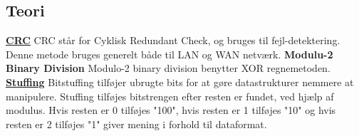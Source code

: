 \subsection{Teori}
\underline{\textbf{CRC}}
\newline
CRC står for Cyklisk Redundant Check, og bruges til fejl-detektering. Denne metode bruges generelt både til LAN og WAN netværk.
\newline
\textbf{Modulu-2 Binary Division}
\newline
Modulo-2 binary division benytter XOR regnemetoden.
\newline
\hfill \break
\underline{\textbf{Stuffing}}
\newline
Bitstuffing tilføjer ubrugte bits for at gøre datastrukturer nemmere at manipulere.
\newline
Stuffing tilføjes bitstrengen efter resten er fundet, ved hjælp af modulus. Hvis resten er 0 tilføjes "100", hvis resten er 1 tilføjes "10" og hvis resten er 2 tilføjes "1"
giver mening i forhold til dataformat.